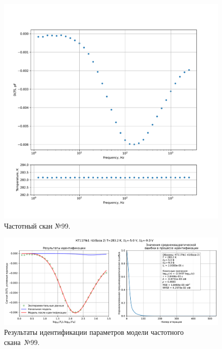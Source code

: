 \begin{figure}[!ht]
    \centering
    \includegraphics[width=1\textwidth]{../plots/КТ117№1_п1(база 2)_2500Гц-1Гц_1пФ_+10С_-5В-9В_100мВ_20мкс_шаг_0,1.pdf}
    \caption{Частотный скан №99.}
    \label{pic:frequency_scan_99}
\end{figure}

\begin{figure}[!ht]
    \centering
    \includegraphics[width=1\textwidth]{../plots/КТ117№1_п1(база 2)_2500Гц-1Гц_1пФ_+10С_-5В-9В_100мВ_20мкс_шаг_0,1_model.pdf}
    \caption{Результаты идентификации параметров модели частотного скана~№99.}
    \label{pic:frequency_scan_model99}
\end{figure}

\pagebreak



